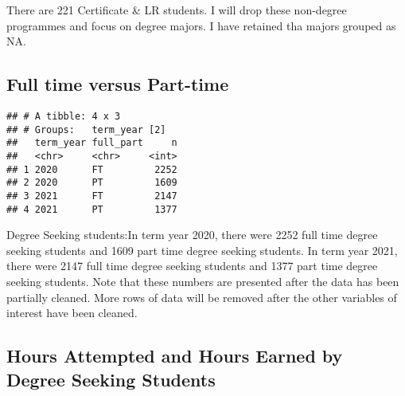 \documentclass[]{article}
\newenvironment{Shaded}{\begin{snugshade}}{\end{snugshade}}
\newcommand{\CommentTok}[1]{\textcolor[rgb]{0.56,0.35,0.01}{\textit{#1}}}
\newcommand{\KeywordTok}[1]{\textcolor[rgb]{0.13,0.29,0.53}{\textbf{#1}}}
\newcommand{\NormalTok}[1]{#1}
\newcommand{\OperatorTok}[1]{\textcolor[rgb]{0.81,0.36,0.00}{\textbf{#1}}}
\newcommand{\StringTok}[1]{\textcolor[rgb]{0.31,0.60,0.02}{#1}}
\begin{document}
There are 221 Certificate \& LR students. I will drop these non-degree
programmes and focus on degree majors. I have retained tha majors
grouped as NA.

\hypertarget{full-time-versus-part-time}{%
\subsection{Full time versus
Part-time}\label{full-time-versus-part-time}}

\begin{Shaded}
\end{Shaded}

\begin{verbatim}
## # A tibble: 4 x 3
## # Groups:   term_year [2]
##   term_year full_part     n
##   <chr>     <chr>     <int>
## 1 2020      FT         2252
## 2 2020      PT         1609
## 3 2021      FT         2147
## 4 2021      PT         1377
\end{verbatim}

Degree Seeking students:In term year 2020, there were 2252 full time
degree seeking students and 1609 part time degree seeking students. In
term year 2021, there were 2147 full time degree seeking students and
1377 part time degree seeking students. Note that these numbers are
presented after the data has been partially cleaned. More rows of data
will be removed after the other variables of interest have been cleaned.

\hypertarget{hours-attempted-and-hours-earned-by-degree-seeking-students}{%
\subsection{Hours Attempted and Hours Earned by Degree Seeking
Students}\label{hours-attempted-and-hours-earned-by-degree-seeking-students}}

\begin{Shaded}
\end{Shaded}
\end{document}
